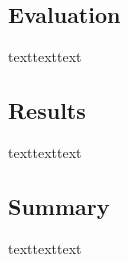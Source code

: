 \documentclass[12pt]{article}
\begin{document}
\subsection{Evaluation}
texttexttext

\subsection{Results}
texttexttext

\subsection{Summary}
texttexttext

\newpage
\medskip

\end{document}
